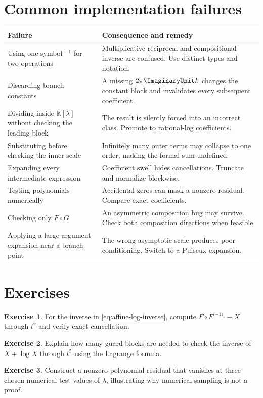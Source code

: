 \documentclass[11pt,openany]{book}
\theoremstyle{definition}
\newtheorem{exercise}{Exercise}[chapter]
\theoremstyle{plain}
\theoremstyle{remark}
\newcommand{\K}{\mathbb{K}}
\newcommand{\invcomp}{^{\langle -1\rangle_{\circ}}}
\begin{document}
\section{Common implementation failures}
\begin{longtable}{@{}p{}p{}@{}}
\toprule
Failure & Consequence and remedy\\
\midrule
\endhead
Using one symbol \(^{-1}\) for two operations & Multiplicative reciprocal and compositional inverse are confused. Use distinct types and notation.\\
Discarding branch constants & A missing \(2\pi\ImaginaryUnit k\) changes the constant block and invalidates every subsequent coefficient.\\
Dividing inside \(\K[\lambda]\) without checking the leading block & The result is silently forced into an incorrect class. Promote to rational-log coefficients.\\
Substituting before checking the inner scale & Infinitely many outer terms may collapse to one order, making the formal sum undefined.\\
Expanding every intermediate expression & Coefficient swell hides cancellations. Truncate and normalize blockwise.\\
Testing polynomials numerically & Accidental zeros can mask a nonzero residual. Compare exact coefficients.\\
Checking only \(F\circ G\) & An asymmetric composition bug may survive. Check both composition directions when feasible.\\
Applying a large-argument expansion near a branch point & The wrong asymptotic scale produces poor conditioning. Switch to a Puiseux expansion.\\
\bottomrule
\end{longtable}

\section{Exercises}
\begin{exercise}
For the inverse in \cref{eq:affine-log-inverse}, compute \(F\circ F\invcomp-X\) through \(t^2\) and verify exact cancellation.
\end{exercise}
\begin{exercise}
Explain how many guard blocks are needed to check the inverse of \(X+\log X\) through \(t^5\) using the Lagrange formula.
\end{exercise}
\begin{exercise}
Construct a nonzero polynomial residual that vanishes at three chosen numerical test values of \(\lambda\), illustrating why numerical sampling is not a proof.
\end{exercise}
\end{document}
